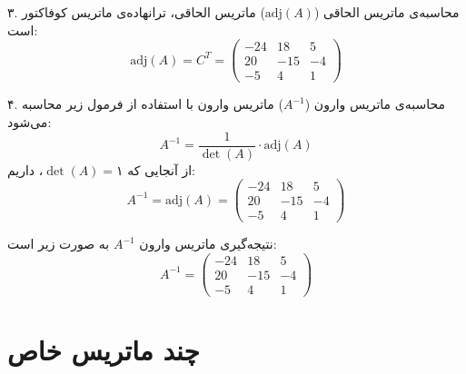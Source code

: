 \begin{scriptsize}
\begin{example}
	
	 ۳. محاسبه‌ی ماتریس الحاقی (\( \text{adj}(A) \))
	ماتریس الحاقی، ترانهاده‌ی ماتریس کوفاکتور است:
	\[
	\text{adj}(A) = C^T = \begin{pmatrix}
		-24 & 18 & 5 \\
		20 & -15 & -4 \\
		-5 & 4 & 1
	\end{pmatrix}
	\]
	

	
	 ۴. محاسبه‌ی ماتریس وارون (\( A^{-1} \))
	ماتریس وارون با استفاده از فرمول زیر محاسبه می‌شود:
	\[
	A^{-1} = \frac{1}{\det(A)} \cdot \text{adj}(A)
	\]
	از آنجایی که \( \det(A) = ۱ \)، داریم:
	\[
	A^{-1} = \text{adj}(A) = \begin{pmatrix}
		-24 & 18 & 5 \\
		20 & -15 & -4 \\
		-5 & 4 & 1
	\end{pmatrix}
	\]
	

	
	 نتیجه‌گیری
	ماتریس وارون \( A^{-1} \) به صورت زیر است:
	\[
	A^{-1} = \begin{pmatrix}
		-24 & 18 & 5 \\
		20 & -15 & -4 \\
		-5 & 4 & 1
	\end{pmatrix}
	\]
	
\end{example}
	\end{scriptsize}
\begin{code}
	\begin{latin}
		  
	\end{latin}
\end{code}

\begin{code}
	\begin{latin}
		  
	\end{latin}
\end{code}
\section{چند ماتریس خاص}	

	
	
